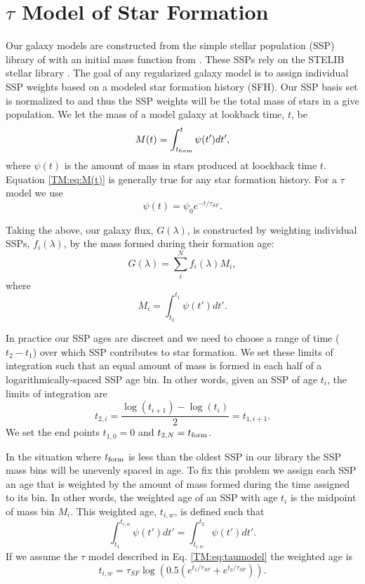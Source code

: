 \chapter{$\tau$ Model of Star Formation}
\label{chap:tau_model}
Our galaxy models are constructed from the simple stellar population
(SSP) library of \citet{Bruzual03} with an initial mass function from
\citet{Chabrier03}. These SSPs rely on the STELIB stellar library
\citep{LeBorgne03}. The goal of any regularized galaxy model is to
assign individual SSP weights based on a modeled star formation
history (SFH). Our SSP basis set is normalized to 
and thus the SSP weights will be the total mass of stars in a give
population. We let the mass of a model galaxy at lookback time, $t$,
be
\begin{equation}
\label{TM:eq:M(t)}
M(t) = \int_{t_{\rm form}}^t \psi(t') dt',
\end{equation}
where $\psi(t)$ is the amount of mass in stars produced at loockback time
$t$. Equation \ref{TM:eq:M(t)} is generally true for any star formation
history. For a $\tau$ model we use
\begin{equation}
\label{TM:eq:taumodel}
\psi(t) = \psi_0 e^{-t/\tau_{SF}}.
\end{equation}

Taking the above, our galaxy flux, $G(\lambda)$, is constructed by weighting
individual SSPs, $f_i(\lambda)$, by the mass formed during their formation age:
\begin{equation}
G(\lambda) = \sum_i^N f_i(\lambda) M_i,
\end{equation}
where
\begin{equation}
M_i = \int_{t_2}^{t_1} \psi(t') dt'.
\end{equation}

In practice our SSP ages are discreet and we need to choose a range of time
($t_2 - t_1$) over which SSP contributes to star formation. We set these
limits of integration such that an equal amount of mass is formed in each half
of a logarithmically-spaced SSP age bin. In other words, given an SSP of age
$t_i$, the limits of integration are
\begin{equation}
t_{2,i} = \frac{\log (t_{i+1}) - \log (t_i)}{2} = t_{1,i+1}.
\end{equation}
We set the end points $t_{1,0} = 0$ and $t_{2,N} = t_{\rm form}$.

In the situation where $t_{\rm form}$ is less than the oldest SSP in
our library the SSP mass bins will be unevenly spaced in age. To fix
this problem we assign each SSP an age that is weighted by the amount
of mass formed during the time assigned to its bin. In other words,
the weighted age of an SSP with age $t_i$ is the midpoint of mass bin
$M_i$. This weighted age, $t_{i,w}$, is defined such that
\begin{equation}
\int_{t_1}^{t_{i,w}} \psi(t') dt' = \int_{t_{i,w}}^{t_2} \psi(t') dt'.
\end{equation}
If we assume the $\tau$ model described in Eq. \ref{TM:eq:taumodel} the weighted age is
\begin{equation}
t_{i,w} = \tau_{SF} \log\left( 0.5 \left( e^{t_1/\tau_{SF}} + e^{t_2/\tau_{SF}} \right)\right).
\end{equation}

